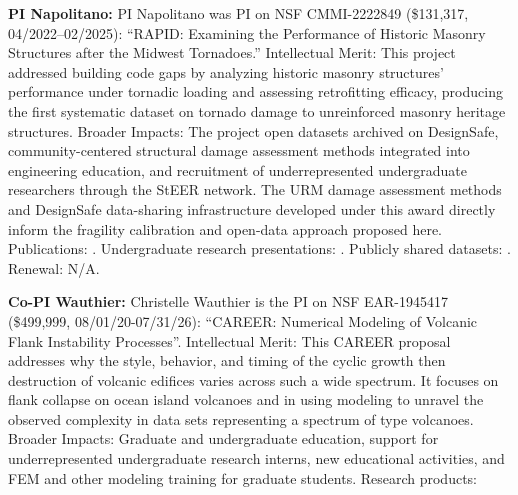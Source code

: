 \documentclass[11pt]{article}
\begin{document}
\noindent\textbf{PI Napolitano:}
PI Napolitano was PI on NSF CMMI-2222849 (\$131,317, 04/2022--02/2025):
``RAPID: Examining the Performance of Historic Masonry Structures after the Midwest
Tornadoes.'' Intellectual Merit: This project addressed building code gaps by
analyzing historic masonry structures' performance under tornadic loading and
assessing retrofitting efficacy, producing the first systematic dataset on tornado
damage to unreinforced masonry heritage structures. Broader Impacts: The project
open datasets archived on DesignSafe, community-centered structural damage
assessment methods integrated into engineering education, and recruitment of
underrepresented undergraduate researchers through the StEER network.
The URM damage assessment methods and DesignSafe data-sharing infrastructure
developed under this award directly inform the fragility calibration and open-data
approach proposed here. Publications: \cite{kaushal2023understanding,
kaushal2023structural, kaushal2023b, sskmgeometric, sskmdatacollection,
sskmstructuralanalysis}. Undergraduate research presentations:
\cite{patelski2022research, whitesides2023research}. Publicly shared datasets:
\cite{steerquad, MapillaryDatasetSteer360, kaushal2023processed, kaushal2023raw}.
Renewal: N/A.

\noindent\textbf{Co-PI Wauthier:}
Christelle Wauthier is the PI on NSF EAR-1945417 (\$499,999, 08/01/20-07/31/26): “CAREER: Numerical Modeling of Volcanic Flank Instability Processes”. Intellectual Merit: This CAREER proposal addresses why the style, behavior, and timing of the cyclic growth then destruction of volcanic edifices varies across such a wide spectrum. It focuses on flank collapse on ocean island volcanoes and in using modeling to unravel the observed complexity in data sets representing a spectrum of type volcanoes. Broader Impacts: Graduate and undergraduate education, support for underrepresented undergraduate research interns, new educational activities, and FEM and other modeling training for graduate students. Research products: \cite{cooper2023coordinating, leeburn2022new, gonzalezsantana2022links, gonzalezsantana2024eruption, gonzalezsantana2021unraveling, poppe2024inversions, kim2024satellite, wauthier2024satellite, gonzalezsantana2025effect}
\end{document}
